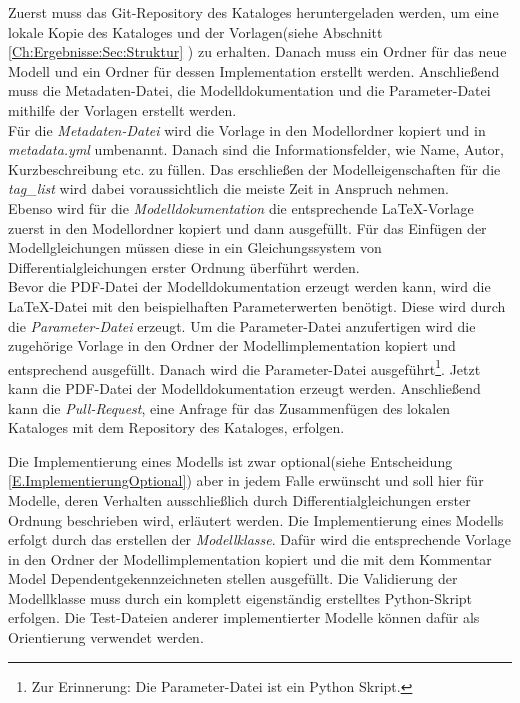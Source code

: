 Zuerst muss das Git-Repository des Kataloges heruntergeladen werden, um eine lokale Kopie des Kataloges und der Vorlagen(siehe Abschnitt \ref{Ch:Ergebnisse:Sec:Struktur} ) zu erhalten. Danach muss ein Ordner für das neue Modell und ein Ordner für dessen Implementation erstellt werden. Anschließend muss die Metadaten-Datei, die Modelldokumentation und die Parameter-Datei mithilfe der Vorlagen erstellt werden.\\
Für die \textit{Metadaten-Datei} wird die Vorlage in den Modellordner kopiert und in \textit{metadata.yml} umbenannt. Danach sind die Informationsfelder, wie Name, Autor, Kurzbeschreibung etc. zu füllen. 
Das erschließen der Modelleigenschaften für die \textit{tag\_list} wird dabei voraussichtlich die meiste Zeit in Anspruch nehmen.\\
Ebenso wird für die \textit{Modelldokumentation} die entsprechende \LaTeX-Vorlage zuerst in den Modellordner kopiert und dann ausgefüllt. Für das Einfügen der Modellgleichungen müssen diese in ein Gleichungssystem von Differentialgleichungen erster Ordnung überführt werden.\\
Bevor die PDF-Datei der Modelldokumentation erzeugt werden kann, wird die \LaTeX-Datei mit den beispielhaften Parameterwerten benötigt. Diese wird durch die \textit{Parameter-Datei} erzeugt. Um die Parameter-Datei anzufertigen wird die zugehörige Vorlage in den Ordner der Modellimplementation kopiert und entsprechend ausgefüllt. Danach wird die Parameter-Datei ausgeführt\footnote{Zur Erinnerung: Die Parameter-Datei ist ein Python Skript.}. Jetzt kann die PDF-Datei der Modelldokumentation erzeugt werden. Anschließend kann die \textit{Pull-Request}, eine Anfrage für das Zusammenfügen des lokalen Kataloges mit dem Repository des Kataloges, erfolgen.

Die Implementierung eines Modells ist zwar optional(siehe Entscheidung \ref{E.ImplementierungOptional}) aber in jedem Falle erwünscht und soll hier für Modelle, deren Verhalten ausschließlich durch Differentialgleichungen erster Ordnung beschrieben wird, erläutert werden. Die Implementierung eines Modells erfolgt durch das erstellen der \textit{Modellklasse}. Dafür wird die entsprechende Vorlage in den Ordner der Modellimplementation kopiert und die mit dem Kommentar \glqq Model Dependent\grqq gekennzeichneten stellen ausgefüllt. Die Validierung der Modellklasse muss durch ein komplett eigenständig erstelltes Python-Skript erfolgen. Die Test-Dateien anderer implementierter Modelle können dafür als Orientierung verwendet werden.



